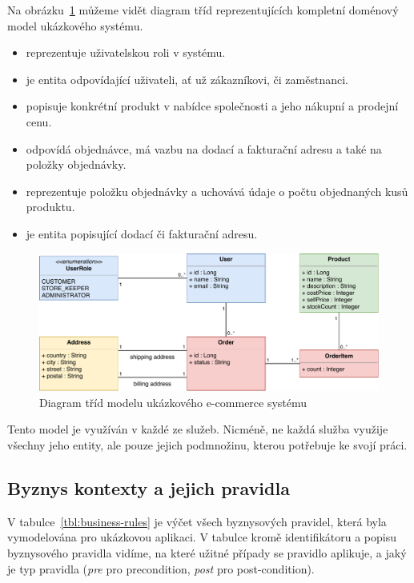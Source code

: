 Na obrázku~\ref{fig:example-model} můžeme vidět diagram tříd reprezentujících
kompletní doménový model ukázkového systému.

\begin{itemize}
    \item \textbf{} reprezentuje uživatelskou roli v systému.
    \item \textbf{} je entita odpovídající uživateli, ať už zákazníkovi, či zaměstnanci.
    \item \textbf{} popisuje konkrétní produkt v nabídce společnosti a jeho nákupní a prodejní cenu.
    \item \textbf{} odpovídá objednávce, má vazbu na dodací a fakturační adresu a také na položky objednávky.
    \item \textbf{} reprezentuje položku objednávky a uchovává údaje o počtu objednaných kusů produktu.
    \item \textbf{} je entita popisující dodací či fakturační adresu.
\end{itemize}

\begin{figure}
    \centering
    \includegraphics[keepaspectratio=true, width=0.9\linewidth]{figures/example-model.pdf}
    \caption{Diagram tříd modelu ukázkového e-commerce systému}
    \label{fig:example-model}
\end{figure}

Tento model je využíván v každé ze služeb. Nicméně, ne každá služba využije všechny jeho entity,
ale pouze jejich podmnožinu, kterou potřebuje ke svojí práci.

\subsection{Byznys kontexty a jejich pravidla}

V tabulce~\ref{tbl:business-rules} je výčet všech byznysových pravidel, která byla
vymodelována pro ukázkovou aplikaci. V tabulce kromě identifikátoru a popisu byznysového pravidla
vidíme, na které užitné případy se pravidlo aplikuje, a jaký je typ pravidla
(\textit{pre} pro precondition, \textit{post} pro post-condition).

